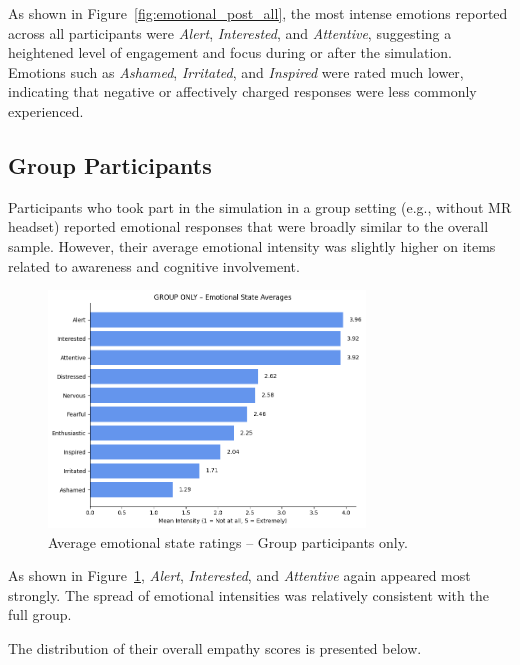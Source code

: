 As shown in Figure~\ref{fig:emotional_post_all}, the most intense emotions reported across all participants were \textit{Alert}, \textit{Interested}, and \textit{Attentive}, suggesting a heightened level of engagement and focus during or after the simulation. Emotions such as \textit{Ashamed}, \textit{Irritated}, and \textit{Inspired} were rated much lower, indicating that negative or affectively charged responses were less commonly experienced.

\subsection{Group Participants}

Participants who took part in the simulation in a group setting (e.g., without MR headset) reported emotional responses that were broadly similar to the overall sample. However, their average emotional intensity was slightly higher on items related to awareness and cognitive involvement.

\begin{figure}[H]
    \centering
    \includegraphics[width=0.75\textwidth]{../../Figures/emotional-post-grp.png}
    \caption{Average emotional state ratings – Group participants only.}
    \label{fig:emotional_post_group}
\end{figure}

As shown in Figure~\ref{fig:emotional_post_group}, \textit{Alert}, \textit{Interested}, and \textit{Attentive} again appeared most strongly. The spread of emotional intensities was relatively consistent with the full group.

The distribution of their overall empathy scores is presented below.

